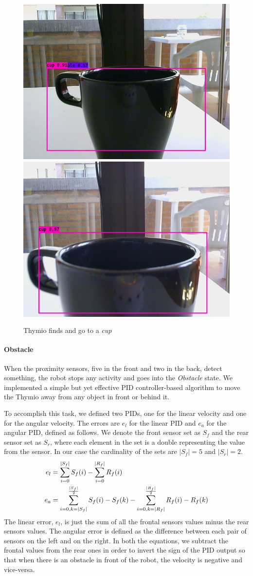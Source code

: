 \documentclass[letterpaper, 10 pt, conference]{ieeeconf}  %
\begin{document}
\begin{figure}[H]
\begin{center}
\end{center}	
\begin{center}
\includegraphics[width=0.48\linewidth]{images/cup/5}	
\includegraphics[width=0.48\linewidth]{images/cup/6}	
\end{center}	
\caption{Thymio finds and go to a \emph{cup}}
\end{figure}

\paragraph{Obstacle} When the proximity sensors, five in the front and two in the back, detect something,  the robot stops any activity and goes into the \emph{Obstacle} state. We implemented a simple but yet effective PID controller-based algorithm to move the Thymio away from any object in front or behind it. 

To accomplish this task, we defined two PIDs, one for the linear velocity and one for the angular velocity. The errors are $e_l$ for the linear PID and $e_a$ for the angular PID, defined as follows. We denote the front sensor set as $S_f$ and the rear sensor set as $S_r$, where each element in the set is a double representing the value from the sensor. In our case the cardinality of the sets are $|S_f| = 5$ and $|S_r|=2$.
\begin{align}
	e_l &= \sum\limits_{i=0}^{|S_f|} S_f(i) - \sum\limits_{i = 0}^{|R_f|} R_f(i) \\
	e_a &= \sum\limits_{i=0,k=|S_f|}^{\frac{|S_f|}{2}} S_f(i) - S_f(k) - \sum\limits_{i=0,k=|R_f|}^{\frac{|R_f|}{2}} R_f(i) - R_f(k)
  \notag
\end{align}
The linear error, $e_l$, is just the sum of all the frontal sensors values minus the rear sensors values.  The angular error is defined as the difference between each pair of sensors on the left and on the right. In both the equations, we subtract the frontal values from the rear ones in order to invert the sign of the PID output so that when there is an obstacle in front of the robot, the velocity is negative and vice-versa. 
\end{document}

